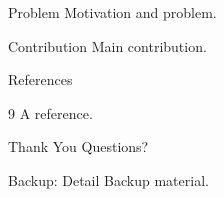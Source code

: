\documentclass{beamer}
\begin{document}
\begin{frame}{Problem}
  Motivation and problem.
\end{frame}
\begin{frame}{Contribution}
  Main contribution.
\end{frame}
\begin{frame}{References}
  \begin{thebibliography}{9}
     A reference.
  \end{thebibliography}
\end{frame}
\begin{frame}{Thank You}
  Questions?
\end{frame}
\appendix
\begin{frame}{Backup: Detail}
  Backup material.
\end{frame}
\end{document}

